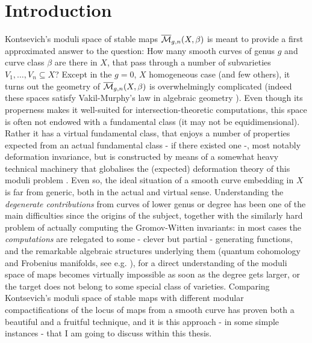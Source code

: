 

\chapter*{Introduction}
Kontsevich's moduli space of stable maps $\overline{\mathcal{M}}_{g,n}(X,\beta)$ \cite{KON} is meant to provide a first approximated answer to the question: How many smooth curves of genus $g$ and curve class $\beta$ are there in $X$, that pass through a number of subvarieties $V_1,\ldots,V_n\subseteq X$? Except in the $g=0$, $X$ homogeneous case (and few others), it turns out the geometry of $\overline{\mathcal{M}}_{g,n}(X,\beta)$ is overwhelmingly complicated (indeed these spaces satisfy Vakil-Murphy's law in algebraic geometry \cite{VakilMurphy}). Even though its properness makes it well-suited for intersection-theoretic computations, this space is often not endowed with a fundamental class (it may not be equidimensional). Rather it has a virtual fundamental class, that enjoys a number of properties expected from an actual fundamental class - if there existed one -, most notably deformation invariance, but is constructed by means of a somewhat heavy technical machinery that globalises the (expected) deformation theory of this moduli problem \cites{LiTian,BF,Behrend}. Even so, the ideal situation of a smooth curve embedding in $X$ is far from generic, both in the actual and virtual sense. Understanding the \emph{degenerate contributions} from curves of lower genus or degree has been one of the main difficulties since the origins of the subject, together with the similarly hard problem of actually computing the Gromov-Witten invariants: in most cases the \emph{computations} are relegated to some - clever but partial - generating functions, and the remarkable algebraic structures underlying them (quantum cohomology and Frobenius manifolds, see e.g. \cite{ManinFrobenius}), for a direct understanding of the moduli space of maps becomes virtually impossible as soon as the degree gets larger, or the target does not belong to some special class of varieties. Comparing Kontsevich's moduli space of stable maps with different modular compactifications of the locus of maps from a smooth curve has proven both a beautiful and a fruitful technique, and it is this approach - in some simple instances - that I am going to discuss within this thesis.

